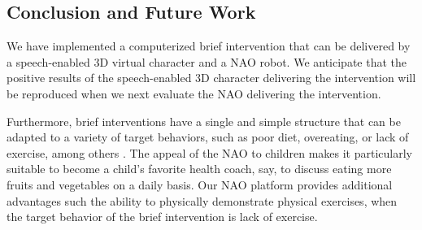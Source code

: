 \documentclass[letterpaper]{article}
\begin{document}
\begin{sloppy}
\section{Conclusion and Future Work} 

We have implemented a computerized brief intervention that can be delivered by a speech-enabled 3D virtual character and a NAO robot.  We anticipate that the positive results of the speech-enabled 3D character delivering the intervention will be reproduced when we next evaluate the NAO delivering the intervention.

Furthermore, brief interventions have a single and simple structure that can be adapted to a variety of target behaviors, such as poor diet, overeating, or lack of exercise, among others \cite{Moyer2002}.
The appeal of the NAO to children 
\cite{belpaeme2012multimodal} makes it particularly suitable to become a child's favorite health 
coach, say, to discuss eating more fruits and vegetables on a daily basis. Our NAO platform 
provides additional advantages such the ability to physically demonstrate physical exercises, when the target behavior of the brief intervention is lack of exercise.

       
   

\end{sloppy}
\end{document}
